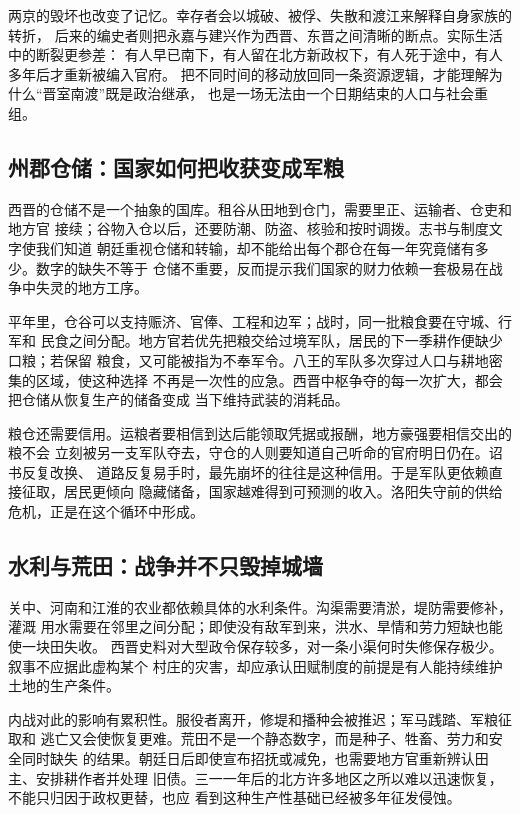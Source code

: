 两京的毁坏也改变了记忆。幸存者会以城破、被俘、失散和渡江来解释自身家族的转折，
后来的编史者则把永嘉与建兴作为西晋、东晋之间清晰的断点。实际生活中的断裂更参差：
有人早已南下，有人留在北方新政权下，有人死于途中，有人多年后才重新被编入官府。
把不同时间的移动放回同一条资源逻辑，才能理解为什么“晋室南渡”既是政治继承，
也是一场无法由一个日期结束的人口与社会重组。

\subsection{州郡仓储：国家如何把收获变成军粮}

西晋的仓储不是一个抽象的国库。租谷从田地到仓门，需要里正、运输者、仓吏和地方官
接续；谷物入仓以后，还要防潮、防盗、核验和按时调拨。志书与制度文字使我们知道
朝廷重视仓储和转输，却不能给出每个郡仓在每一年究竟储有多少。数字的缺失不等于
仓储不重要，反而提示我们国家的财力依赖一套极易在战争中失灵的地方工序。

平年里，仓谷可以支持赈济、官俸、工程和边军；战时，同一批粮食要在守城、行军和
民食之间分配。地方官若优先把粮交给过境军队，居民的下一季耕作便缺少口粮；若保留
粮食，又可能被指为不奉军令。八王的军队多次穿过人口与耕地密集的区域，使这种选择
不再是一次性的应急。西晋中枢争夺的每一次扩大，都会把仓储从恢复生产的储备变成
当下维持武装的消耗品。

粮仓还需要信用。运粮者要相信到达后能领取凭据或报酬，地方豪强要相信交出的粮不会
立刻被另一支军队夺去，守仓的人则要知道自己听命的官府明日仍在。诏书反复改换、
道路反复易手时，最先崩坏的往往是这种信用。于是军队更依赖直接征取，居民更倾向
隐藏储备，国家越难得到可预测的收入。洛阳失守前的供给危机，正是在这个循环中形成。

\subsection{水利与荒田：战争并不只毁掉城墙}

关中、河南和江淮的农业都依赖具体的水利条件。沟渠需要清淤，堤防需要修补，灌溉
用水需要在邻里之间分配；即使没有敌军到来，洪水、旱情和劳力短缺也能使一块田失收。
西晋史料对大型政令保存较多，对一条小渠何时失修保存极少。叙事不应据此虚构某个
村庄的灾害，却应承认田赋制度的前提是有人能持续维护土地的生产条件。

内战对此的影响有累积性。服役者离开，修堤和播种会被推迟；军马践踏、军粮征取和
逃亡又会使恢复更难。荒田不是一个静态数字，而是种子、牲畜、劳力和安全同时缺失
的结果。朝廷日后即使宣布招抚或减免，也需要地方官重新辨认田主、安排耕作者并处理
旧债。三一一年后的北方许多地区之所以难以迅速恢复，不能只归因于政权更替，也应
看到这种生产性基础已经被多年征发侵蚀。

